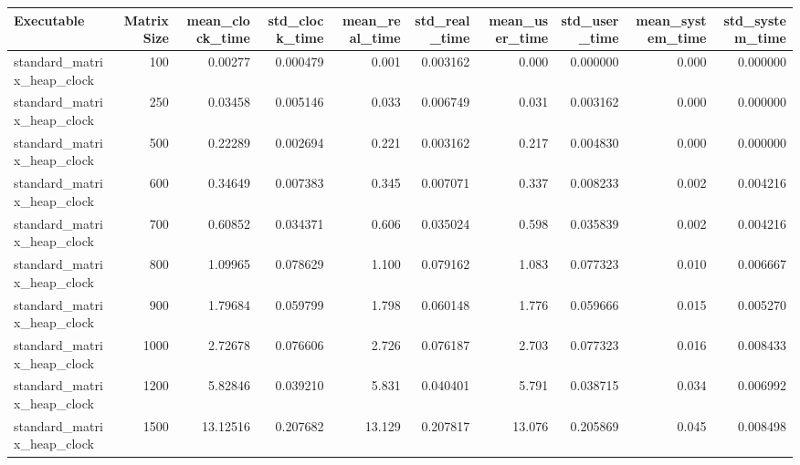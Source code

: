 \begin{tabular}{lrrrrrrrrr}
\toprule
                Executable &  Matrix Size &  mean\_clock\_time &  std\_clock\_time &  mean\_real\_time &  std\_real\_time &  mean\_user\_time &  std\_user\_time &  mean\_system\_time &  std\_system\_time \\
\midrule
standard\_matrix\_heap\_clock &          100 &          0.00277 &        0.000479 &           0.001 &       0.003162 &           0.000 &       0.000000 &             0.000 &         0.000000 \\
standard\_matrix\_heap\_clock &          250 &          0.03458 &        0.005146 &           0.033 &       0.006749 &           0.031 &       0.003162 &             0.000 &         0.000000 \\
standard\_matrix\_heap\_clock &          500 &          0.22289 &        0.002694 &           0.221 &       0.003162 &           0.217 &       0.004830 &             0.000 &         0.000000 \\
standard\_matrix\_heap\_clock &          600 &          0.34649 &        0.007383 &           0.345 &       0.007071 &           0.337 &       0.008233 &             0.002 &         0.004216 \\
standard\_matrix\_heap\_clock &          700 &          0.60852 &        0.034371 &           0.606 &       0.035024 &           0.598 &       0.035839 &             0.002 &         0.004216 \\
standard\_matrix\_heap\_clock &          800 &          1.09965 &        0.078629 &           1.100 &       0.079162 &           1.083 &       0.077323 &             0.010 &         0.006667 \\
standard\_matrix\_heap\_clock &          900 &          1.79684 &        0.059799 &           1.798 &       0.060148 &           1.776 &       0.059666 &             0.015 &         0.005270 \\
standard\_matrix\_heap\_clock &         1000 &          2.72678 &        0.076606 &           2.726 &       0.076187 &           2.703 &       0.077323 &             0.016 &         0.008433 \\
standard\_matrix\_heap\_clock &         1200 &          5.82846 &        0.039210 &           5.831 &       0.040401 &           5.791 &       0.038715 &             0.034 &         0.006992 \\
standard\_matrix\_heap\_clock &         1500 &         13.12516 &        0.207682 &          13.129 &       0.207817 &          13.076 &       0.205869 &             0.045 &         0.008498 \\
\bottomrule
\end{tabular}
